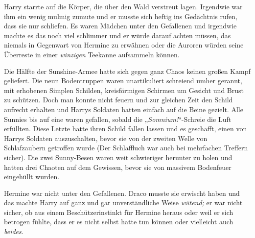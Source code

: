 \later

Harry starrte auf die Körper, die über den Wald verstreut lagen. Irgendwie war ihm ein wenig mulmig zumute und er musste sich heftig ins Gedächtnis rufen, dass sie nur schliefen. Es waren Mädchen unter den Gefallenen und irgendwie machte es das noch viel schlimmer und er würde darauf achten müssen, das niemals in Gegenwart von Hermine zu erwähnen oder die Auroren würden seine Überreste in einer \emph{winzigen} Teekanne aufsammeln können.

Die Hälfte der Sunshine-Armee hatte sich gegen ganz Chaos keinen großen Kampf geliefert. Die neun Bodentruppen waren unartikuliert schreiend umher gerannt, mit erhobenen Simplen Schilden, kreisförmigen Schirmen um Gesicht und Brust zu schützen. Doch man konnte nicht feuern und zur gleichen Zeit den Schild aufrecht erhalten und Harrys Soldaten hatten einfach auf die Beine gezielt. Alle Sunnies bis auf eine waren gefallen, sobald die „\emph{Somnium!}“-Schreie die Luft erfüllten. Diese Letzte hatte ihren Schild fallen lassen und es geschafft, einen von Harrys Soldaten auszuschalten, bevor sie von der zweiten Welle von Schlafzaubern getroffen wurde (Der Schlaffluch war auch bei mehrfachen Treffern sicher). Die zwei Sunny-Besen waren weit schwieriger herunter zu holen und hatten drei Chaoten auf dem Gewissen, bevor sie von massivem Bodenfeuer eingehüllt wurden.

Hermine war nicht unter den Gefallenen. Draco musste sie erwischt haben und das machte Harry auf ganz und gar unverständliche Weise \emph{wütend;} er war nicht sicher, ob aus einem Beschützerinstinkt für Hermine heraus oder weil er sich betrogen fühlte, dass er es nicht selbst hatte tun können oder vielleicht auch \emph{beides}.

